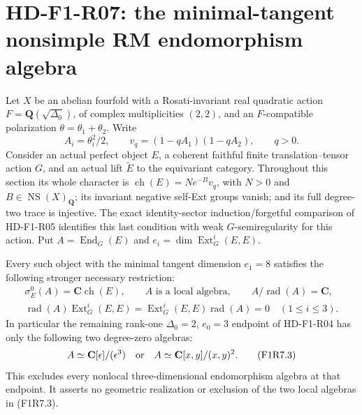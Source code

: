 \section{HD-F1-R07: the minimal-tangent nonsimple RM endomorphism algebra}
\label{sec:followup-rm-endomorphism-algebra}

Let $X$ be an abelian fourfold with a Rosati-invariant real quadratic
action $F=\mathbf Q(\sqrt{\Delta_0})$, of complex multiplicities $(2,2)$,
and an $F$-compatible polarization $\theta=\theta_1+\theta_2$. Write
\[
 A_i=\theta_i^2/2,\qquad
 v_q=(1-qA_1)(1-qA_2),\qquad q>0.
 \tag{F1R7.1}
\]
Consider an actual perfect object $E$, a coherent faithful finite
translation--tensor action $G$, and an actual lift $\widetilde E$ to the
equivariant category. Throughout this section its whole character is
$\operatorname{ch}(E)=N e^{-B}v_q$, with $N>0$ and
$B\in\operatorname{NS}(X)_{\mathbf Q}$; its invariant negative self-Ext
groups vanish; and its full degree-two trace is injective. The exact
identity-sector induction/forgetful comparison of HD-F1-R05 identifies
this last condition with weak $G$-semiregularity for this action.
Put $A=\operatorname{End}_G(E)$ and $e_i=\dim\operatorname{Ext}^i_G(E,E)$.

Every such object with the minimal tangent dimension $e_1=8$ satisfies
the following stronger necessary restriction:
\[
 \begin{gathered}
 \sigma_E^0(A)=\mathbf C\operatorname{ch}(E),\qquad
 A\text{ is a local algebra},\qquad A/\operatorname{rad}(A)=\mathbf C,\\
 \operatorname{rad}(A)\operatorname{Ext}^i_G(E,E)
   =\operatorname{Ext}^i_G(E,E)\operatorname{rad}(A)=0
       \quad(1\le i\le3).
 \end{gathered}
 \tag{F1R7.2}
\]
In particular the remaining rank-one $\Delta_0=2$, $e_0=3$ endpoint
of HD-F1-R04 has only the following two degree-zero algebras:
\[
 A\simeq\mathbf C[\epsilon]/(\epsilon^3)
 \quad\hbox{or}\quad
 A\simeq\mathbf C[x,y]/(x,y)^2.
 \tag{F1R7.3}
\]
This excludes every nonlocal three-dimensional endomorphism algebra
at that endpoint. It asserts no geometric realization or exclusion of
the two local algebras in (F1R7.3).


